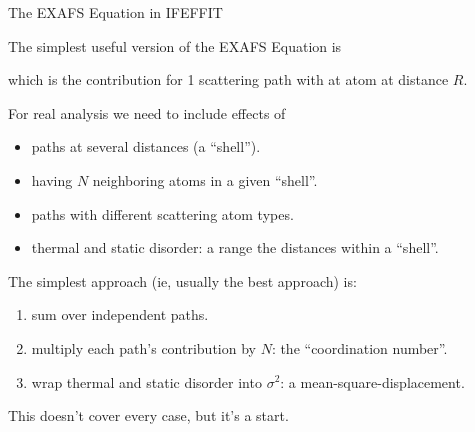 
\begin{slide}{The EXAFS Equation in IFEFFIT}
    
    The simplest useful version of the EXAFS Equation is

    {\large
      \begin{center}
      \end{center}  }
    
    \vmm
        
    which is the contribution for 1 scattering path with at atom at
    distance ${R}$.

    \vmm
    For real analysis we need to include  effects of

    \begin{itemize}\setlength{\itemindent}{3mm}
    \item paths at several distances (a ``shell'').
    \item having ${N}$ neighboring atoms in a given ``shell''.
    \item paths with different scattering atom types.
    \item thermal and static disorder: a range the distances within a ``shell''.
    \end{itemize}


    The simplest approach (ie, usually the best approach) is:


    \begin{enumerate}\setlength{\itemindent}{3mm}
    \item sum over independent paths.
    \item multiply each path's contribution by  ${N}$: the
      ``coordination number''.
    \item wrap thermal and static disorder into ${\sigma^2}$: a
      mean-square-displacement.
    \end{enumerate}
    
    This doesn't cover every case, but it's a start.

\vfill
\end{slide} 

